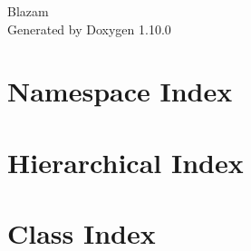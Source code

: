 \documentclass[twoside]{book}
\newcommand{\+}{\discretionary{\mbox{\scriptsize$\hookleftarrow$}}{}{}}
\newcommand{\clearemptydoublepage}{%
    \newpage{\pagestyle{empty}\cleardoublepage}%
  }
\begin{document}
  \raggedbottom
    \hypersetup{pageanchor=false,
                bookmarksnumbered=true,
                pdfencoding=unicode
               }
  \begin{titlepage}
  \vspace*{7cm}
  \begin{center}%
  {\Large Blazam}\\
  \vspace*{1cm}
  {\large Generated by Doxygen 1.10.0}\\
  \end{center}
  \end{titlepage}
  \clearemptydoublepage
  \tableofcontents
  \clearemptydoublepage
  \hypersetup{pageanchor=true}











\chapter{Namespace Index}

\chapter{Hierarchical Index}

\chapter{Class Index}

\end{document}
